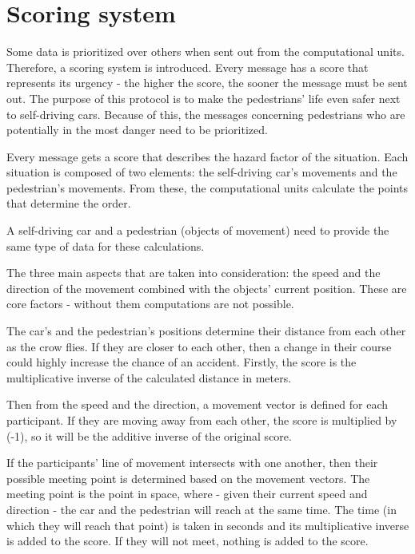 \documentclass[conference]{IEEEtran}
\begin{document}
\section{Scoring system}

Some data is prioritized over others when sent out from the computational units. Therefore, a scoring system is introduced. Every message has a score that represents its urgency - the higher the score, the sooner the message must be sent out. The purpose of this protocol is to make the pedestrians’ life even safer next to self-driving cars. Because of this, the messages concerning pedestrians who are potentially in the most danger need to be prioritized.

Every message gets a score that describes the hazard factor of the situation. Each situation is composed of two elements: the self-driving car's movements and the pedestrian's movements. From these, the computational units calculate the points that determine the order.

A self-driving car and a pedestrian (objects of movement) need to provide the same type of data for these calculations.

The three main aspects that are taken into consideration: the speed and the direction of the movement combined with the objects’ current position. These are core factors - without them computations are not possible.

The car's and the pedestrian's positions determine their distance from each other as the crow flies. If they are closer to each other, then a change in their course could highly increase the chance of an accident. Firstly, the score is the multiplicative inverse of the calculated distance in meters.

Then from the speed and the direction, a movement vector is defined for each participant. If they are moving away from each other, the score is multiplied by (-1), so it will be the additive inverse of the original score.

If the participants' line of movement intersects with one another, then their possible meeting point is determined based on the movement vectors. The meeting point is the point in space, where - given their current speed and direction - the car and the pedestrian will reach at the same time. The time (in which they will reach that point) is taken in seconds and its multiplicative inverse is added to the score. If they will not meet, nothing is added to the score.
\end{document}
